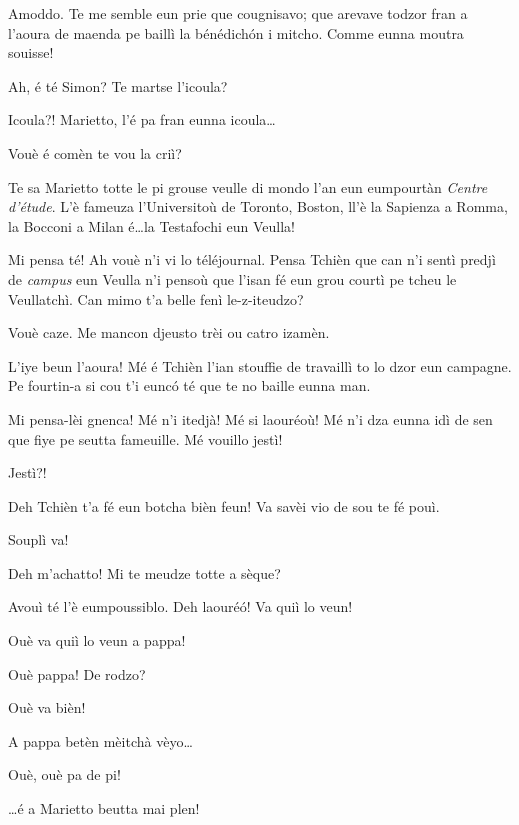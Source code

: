 \begin{drama}
\Cienspeaks Amoddo. Te me semble eun prie que cougnisavo; que arevave todzor fran a l’aoura de maenda pe baillì la bénédich\'on i mitcho. Comme eunna moutra souisse!

\Mariettospeaks Ah, é té Simon? Te martse l’icoula?

\Simonspeaks Icoula?! Marietto, l’é pa fran eunna icoula\ldots

\Mariettospeaks Vouè é comèn te vou la criì?

\Simonspeaks Te sa Marietto totte le pi grouse veulle di mondo l’an eun eumpourtàn \textit{Centre d'étude}. L’è fameuza l’Universitoù de Toronto, Boston, ll'è la Sapienza a Romma, la Bocconi a Milan é\ldots la Testafochi eun Veulla!

\Mariettospeaks Mi pensa té! Ah vouè n’i vi lo téléjournal. Pensa Tchièn que can n’i sentì predjì de \textit{campus} eun Veulla n’i pensoù que l’isan fé eun grou courtì pe tcheu le Veullatchì. Can mimo t’a belle fenì le-z-iteudzo?

\Simonspeaks Vouè caze. Me mancon djeusto trèi ou catro izamèn.

\Mariettospeaks L'iye beun l’aoura! Mé é Tchièn l'ian stouffie de travaillì to lo dzor eun campagne. Pe fourtin-a si cou t’i eunc\'o té que te no baille eunna man.

\Simonspeaks Mi pensa-lèi gnenca! Mé n'i itedjà! Mé si laouréoù! Mé n’i dza eunna idì de sen que fiye pe seutta fameuille. Mé vouillo jestì!

\Cienspeaks Jestì?!

\Mariettospeaks Deh Tchièn t’a fé eun botcha bièn feun! Va savèi vio de sou te fé pouì.

\Cienspeaks Souplì va!

\Mariettospeaks Deh m’achatto!  Mi te meudze totte a sèque?

\Cienspeaks Avouì té l’è eumpoussiblo.  Deh laouré\'o! Va quiì lo veun!

\Mariettospeaks Ouè va quiì lo veun a pappa!

\Simonspeaks {} Ouè pappa! De rodzo?

\Mariettospeaks Ouè va bièn!


\Simonspeaks A pappa betèn mèitchà vèyo\ldots

\Cienspeaks Ouè, ouè pa de pi!

\Mariettospeaks \ldots é a Marietto beutta mai plen!


\end{drama}
